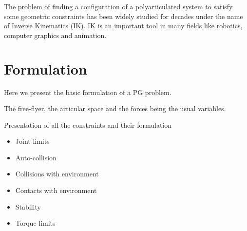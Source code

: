 The problem of finding a configuration of a polyarticulated system to satisfy some geometric constraints has been widely studied for decades under the name of Inverse Kinematics (IK).
IK is an important tool in many fields like robotics, computer graphics and animation.





\section{Formulation}

Here we present the basic formulation of a PG problem.

The free-flyer, the articular space and the forces being the usual variables.

Presentation of all the constraints and their formulation
\begin{itemize}
  \item Joint limits
  \item Auto-collision
  \item Collisions with environment
  \item Contacts with environment
  \item Stability
  \item Torque limits
\end{itemize}

